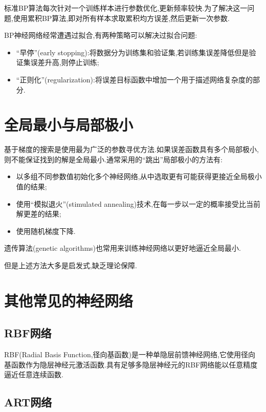 标准BP算法每次针对一个训练样本进行参数优化,更新频率较快.为了解决这一问题,使用累积BP算法,即对所有样本求取累积均方误差,然后更新一次参数.

BP神经网络经常遭遇过拟合,有两种策略可以解决过拟合问题:

\begin{itemize}
\item ``早停''(early stopping):将数据分为训练集和验证集,若训练集误差降低但是验证集误差升高,则停止训练;
\item ``正则化''(regularization):将误差目标函数中增加一个用于描述网络复杂度的部分.
\end{itemize}

\section{全局最小与局部极小}

基于梯度的搜索是使用最为广泛的参数寻优方法.如果误差函数具有多个局部极小,则不能保证找到的解是全局最小.通常采用的``跳出''局部极小的方法有:

\begin{itemize}
\item 以多组不同参数值初始化多个神经网络,从中选取更有可能获得更接近全局极小值的结果;
\item 使用``模拟退火''(stimulated annealing)技术,在每一步以一定的概率接受比当前解更差的结果;
\item 使用随机梯度下降.
\end{itemize}

遗传算法(genetic algorithms)也常用来训练神经网络以更好地逼近全局最小.

但是上述方法大多是启发式,缺乏理论保障.

\section{其他常见的神经网络}

\subsection{RBF网络}

RBF(Radial Basis Function,径向基函数)是一种单隐层前馈神经网络,它使用径向基函数作为隐层神经元激活函数.具有足够多隐层神经元的RBF网络能以任意精度逼近任意连续函数.

\subsection{ART网络}

